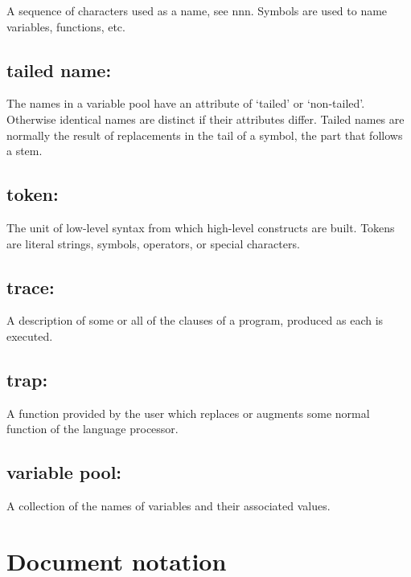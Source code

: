 A sequence of characters used as a name, see nnn. Symbols are used to
name variables, functions, etc.

\hypertarget{tailed-name}{%
\subsection{tailed name:}\label{tailed-name}}

The names in a variable pool have an attribute of `tailed' or
`non-tailed'. Otherwise identical names are distinct if their attributes
differ. Tailed names are normally the result of replacements in the tail
of a symbol, the part that follows a stem.

\hypertarget{token}{%
\subsection{token:}\label{token}}

The unit of low-level syntax from which high-level constructs are built.
Tokens are literal strings, symbols, operators, or special characters.

\hypertarget{trace}{%
\subsection{trace:}\label{trace}}

A description of some or all of the clauses of a program, produced as
each is executed.

\hypertarget{trap}{%
\subsection{trap:}\label{trap}}

A function provided by the user which replaces or augments some normal
function of the language processor.

\hypertarget{variable-pool}{%
\subsection{variable pool:}\label{variable-pool}}

A collection of the names of variables and their associated values.

\hypertarget{document-notation}{%
\section{Document notation}\label{document-notation}}

